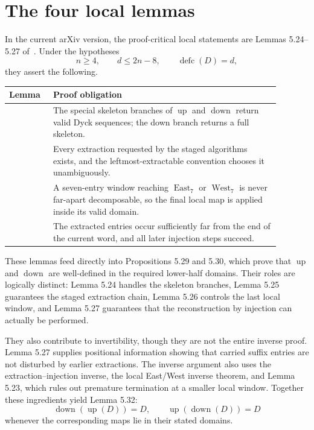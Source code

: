 \documentclass{article}
\newcommand{\defc}{\operatorname{defc}}
\newcommand{\upmap}{\operatorname{up}}
\newcommand{\downmap}{\operatorname{down}}
\newcommand{\East}{\operatorname{East}}
\newcommand{\West}{\operatorname{West}}
\begin{document}
\section{The four local lemmas}

In the current arXiv version, the proof-critical local statements are Lemmas
5.24--5.27 of~\cite{Hawkes2026}.  Under the hypotheses
\[
  n\geq4,
  \qquad d\leq2n-8,
  \qquad \defc(D)=d,
\]
they assert the following.

\begin{center}
\begin{tabular}{>{\raggedright\arraybackslash}p{0.14\linewidth}
                >{\raggedright\arraybackslash}p{0.75\linewidth}}
\toprule
Lemma & Proof obligation \\
\midrule
5.24 & The special skeleton branches of $\upmap$ and $\downmap$ return valid
Dyck sequences; the down branch returns a full skeleton. \\
5.25 & Every extraction requested by the staged algorithms exists, and the
leftmost-extractable convention chooses it unambiguously. \\
5.26 & A seven-entry window reaching $\East_7$ or $\West_7$ is never
far-apart decomposable, so the final local map is applied inside its valid
domain. \\
5.27 & The extracted entries occur sufficiently far from the end of the
current word, and all later injection steps succeed. \\
\bottomrule
\end{tabular}
\end{center}

These lemmas feed directly into Propositions 5.29 and 5.30, which prove that
$\upmap$ and $\downmap$ are well-defined in the required lower-half domains.
Their roles are logically distinct: Lemma 5.24 handles the skeleton branches,
Lemma 5.25 guarantees the staged extraction chain, Lemma 5.26 controls the
last local window, and Lemma 5.27 guarantees that the reconstruction by
injection can actually be performed.

They also contribute to invertibility, though they are not the entire inverse
proof.  Lemma 5.27 supplies positional information showing that carried suffix
entries are not disturbed by earlier extractions.  The inverse argument also
uses the extraction--injection inverse, the local East/West inverse theorem,
and Lemma 5.23, which rules out premature termination at a smaller local
window.  Together these ingredients yield Lemma 5.32:
\[
  \downmap(\upmap(D))=D,
  \qquad
  \upmap(\downmap(D))=D
\]
whenever the corresponding maps lie in their stated domains.
\end{document}
